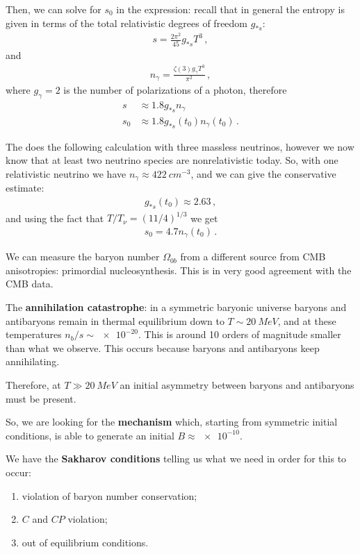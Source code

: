 \documentclass[main.tex]{subfiles}
\begin{document}
Then, we can solve for \(s_0 \) in the expression: recall that in general
the entropy is given in terms of the total relativistic degrees of freedom \(g_{*s}\):
%
\begin{align}
s = \frac{2 \pi^2}{45} g_{*s} T^3
\,,
\end{align}
%
and 
%
\begin{align}
n_\gamma = \frac{\zeta (3) g_\gamma T^3}{\pi^2}
\,,
\end{align}
%
where \(g_\gamma = 2\) is the number of polarizations of a photon, therefore 
%
\begin{align} \label{eq:entropy-approximate}
s &\approx \num{1.8} g_{*s} n_\gamma  \\
s_0 &\approx \num{1.8} g_{*s}(t_0 ) n_\gamma (t_0 )
\,.
\end{align}

The \textcite{kolbEarlyUniverse1994} does the following calculation with three massless neutrinos, however we now know that at least two neutrino species are nonrelativistic today. 
So, with one relativistic neutrino we have \(n_\gamma \approx \SI{422}{cm^{-3}}\), and we can give the conservative estimate:
%
\begin{align}
g_{*s}(t_0 ) \approx \num{2.63}
\,,
\end{align}
%
and using the fact that \( T / T_\nu = (11/4)^{1/3}\) we get 
%
\begin{align}
s_0 = \num{4.7} n_\gamma (t_0 )
\,.
\end{align}

We can measure the baryon number \(\Omega_{0b}\) from a different source from CMB anisotropies: primordial nucleosynthesis. 
This is in very good agreement with the CMB data. 

The \textbf{annihilation catastrophe}: in a symmetric baryonic universe baryons and antibaryons remain in thermal equilibrium down to \(T \sim \SI{20}{MeV}\), and at these temperatures \(n_b / s \sim \num{e-20}\). 
This is around 10 orders of magnitude smaller than what we observe. 
This occurs because baryons and antibaryons keep annihilating. 

Therefore, at \(T \gg \SI{20}{MeV}\) an initial asymmetry between baryons and antibaryons must be present. 

So, we are looking for the \textbf{mechanism} which, starting from symmetric initial conditions, is able to generate an initial \(B \approx \num{e-10}\).

We have the \textbf{Sakharov conditions} telling us what we need in order for this to occur: 
\begin{enumerate}
    \item violation of baryon number conservation;
    \item \(C\) and \(CP\) violation;
    \item out of equilibrium conditions.
\end{enumerate}
\end{document}
